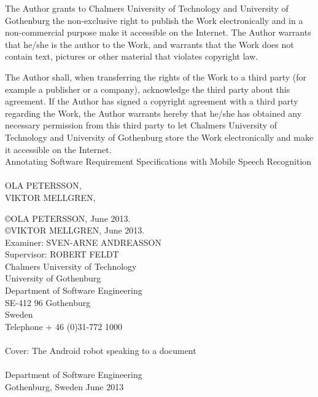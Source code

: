 \begin{flushleft}
{\noindent
The Author grants to Chalmers University of Technology and University of Gothenburg
the non-exclusive right to publish the Work electronically and in a non-commercial
purpose make it accessible on the Internet. The Author warrants that he/she is the author
to the Work, and warrants that the Work does not contain text, pictures or other material
that violates copyright law.
 
The Author shall, when transferring the rights of the Work to a third party (for example
a publisher or a company), acknowledge the third party about this agreement. If the
Author has signed a copyright agreement with a third party regarding the Work, the
Author warrants hereby that he/she has obtained any necessary permission from this
third party to let Chalmers University of Technology and University of Gothenburg
store the Work electronically and make it accessible on the Internet.\\[.8cm]


\large{Annotating Software Requirement Specifications with Mobile Speech Recognition}\\[.2cm]
 
\null
\\

\uppercase{Ola Petersson},\\
\uppercase{Viktor Mellgren},\\[.2cm]
\null

\copyright \uppercase{Ola Petersson}, June 2013.\\
\copyright \uppercase{Viktor Mellgren}, June 2013. \\[.2cm]
 
Examiner: SVEN-ARNE ANDREASSON \\
Supervisor: \uppercase{ROBERT FELDT} \\[.2cm]
 
Chalmers University of Technology\\
University of Gothenburg\\
Department of Software Engineering\\
SE-412 96 Gothenburg\\
Sweden\\
Telephone + 46 (0)31-772 1000\\
\\
\null
\vfill
 Cover: The Android robot speaking to a document\\
    \null
    \\
Department of Software Engineering\\
Gothenburg, Sweden June 2013\\
}
\end{flushleft}